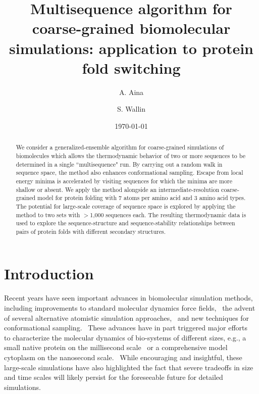 \documentclass[
aip,
rsi,%
amsmath,amssymb,
reprint,%
]{revtex4-1}
\begin{document}

\title[Multisequence Monte Carlo simulations]{Multisequence algorithm for coarse-grained biomolecular simulations: application to protein fold switching}

\author{A. Aina}
\author{S. Wallin}

\date{\today}

\begin{abstract}
We consider a generalized-ensemble algorithm for coarse-grained simulations of biomolecules which allows the thermodynamic behavior of two or more sequences to be determined in a single ``multisequence" run. By carrying out a random walk in sequence space, the method also enhances conformational sampling. Escape from local energy minima is accelerated by visiting sequences for which the minima are more shallow or absent. We apply the method alongside an intermediate-resolution coarse-grained model for protein folding with 7 atoms per amino acid and 3 amino acid types. The potential for large-scale coverage of sequence space is explored by applying the method to two sets with $>$1,000 sequences each. The resulting thermodynamic data is used to explore the sequence-structure and sequence-stability relationships between pairs of protein folds with different secondary structures.
\end{abstract}

                             

\maketitle

\section{Introduction}
\noindent
Recent years have seen important advances in biomolecular simulation methods, including improvements to standard molecular dynamics force fields,~\cite{Piana2014} the advent of several alternative atomistic simulation approaches,~\cite{Ding2008,Irback2006,Verma2009,Yang2007} and new techniques for  conformational sampling.~\cite{Bernardi2015} These advances have in part triggered major efforts~\cite{McGuffee2010,Perilla2016,Lindorff-Larsen2011,Yu2016} to characterize the molecular dynamics of bio-systems of different sizes, e.g., a small native protein on the millisecond scale~\cite{Lindorff-Larsen2011} or a comprehensive model cytoplasm on the nanosecond scale.~\cite{Yu2016} While encouraging and insightful, these large-scale simulations have also highlighted the fact that severe tradeoffs in size and time scales will likely persist for the foreseeable future for detailed simulations. 
\end{document}
